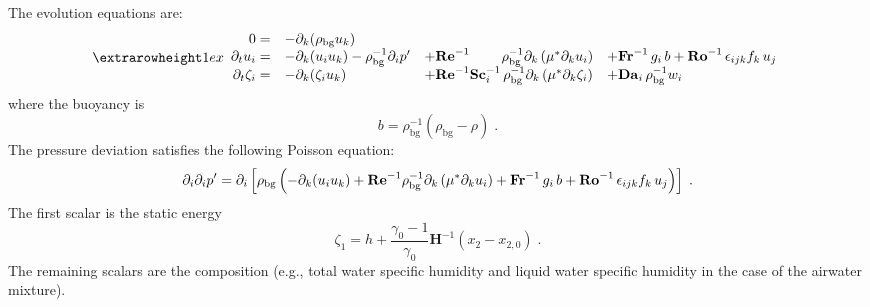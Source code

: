 The evolution equations are:
\begin{equation}
\setlength{\extrarowheight}{1ex}
\begin{array}{rlll}
  0 =&
  -\partial_k(\rho_\mathrm{bg}u_k)   & \\
  \partial_t  u_i =& 
  -\partial_k ( u_i u_k )-\rho_\mathrm{bg}^{-1}\partial_i p' &
  +\mathrm{\bf Re}^{-1}\qquad\;\rho_\mathrm{bg}^{-1}\partial_k \left( \mu^{*} \partial_k u_i\right) &
  +\mathrm{\bf Fr}^{-1}\, g_i\,b+\mathrm{\bf Ro}^{-1}\,\epsilon_{ijk} f_k\,u_j  \\
  \partial_t \zeta_i =&
  -\partial_k (\zeta_i u_k) &
  + \mathrm{\bf Re}^{-1}\mathrm{\bf Sc}_i^{-1}\, \rho_\mathrm{bg}^{-1}\partial_k \left( \mu^{*}\partial_k\zeta_i\right) &+ \mathrm{\bf Da}_i\,\rho_\mathrm{bg}^{-1}w_i
\end{array}
\end{equation}
where the buoyancy is
\begin{equation}
  b=\rho_\mathrm{bg}^{-1}(\rho_\mathrm{bg}-\rho) \;.
\end{equation}
The pressure deviation satisfies the following Poisson equation:
\begin{equation}
  \partial_i\partial_ip'=\partial_i\left[\rho_\mathrm{bg}\left(
-\partial_k ( u_i u_k )+\mathrm{\bf Re}^{-1}\rho_\mathrm{bg}^{-1}\partial_k \left( \mu^{*} \partial_k u_i\right) +\mathrm{\bf Fr}^{-1}\, g_i\,b+\mathrm{\bf Ro}^{-1}\,\epsilon_{ijk} f_k\,u_j  
\right)\right]\;.
\end{equation}
The first scalar is the static energy
\begin{equation}
  \zeta_1 = h + \frac{\gamma_0-1}{\gamma_0}\mathbf{H}^{-1}(x_2-x_{2,0}) \;.
\end{equation}
The remaining scalars are the composition (e.g., total water specific humidity and liquid water specific humidity in the case of the airwater mixture).
